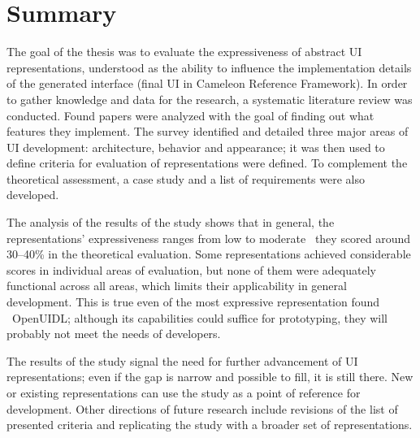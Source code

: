 \chapter{Summary}\label{ch:summary}

The goal of the thesis was to evaluate the expressiveness of abstract UI representations, understood as the ability to influence the implementation details of the generated interface (final UI in Cameleon Reference Framework).
In order to gather knowledge and data for the research, a systematic literature review was conducted.
Found papers were analyzed with the goal of finding out what features they implement.
The survey identified and detailed three major areas of UI development: architecture, behavior and appearance; it was then used to define criteria for evaluation of representations were defined.
To complement the theoretical assessment, a case study and a list of requirements were also developed.

The analysis of the results of the study shows that in general, the representations' expressiveness ranges from low to moderate \textendash\ they scored around 30--40\% in the theoretical evaluation.
Some representations achieved considerable scores in individual areas of evaluation, but none of them were adequately functional across all areas, which limits their applicability in general development.
This is true even of the most expressive representation found \textendash\ OpenUIDL; although its capabilities could suffice for prototyping, they will probably not meet the needs of developers.


The results of the study signal the need for further advancement of UI representations;  even if the gap is narrow and possible to fill, it is still there.
New or existing representations can use the study as a point of reference for development.
Other directions of future research include revisions of the list of presented criteria and replicating the study with a broader set of representations.

